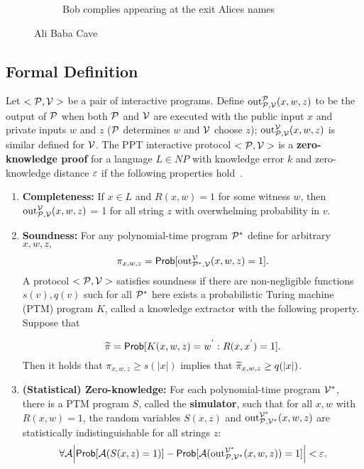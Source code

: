 \begin{figure}[t!]
\begin{subfigure}[t]{0.30\textwidth}
{\begin{tikzpicture}[scale=1]
      \end{tikzpicture}
    }
    \caption{Bob complies appearing at the exit Alices names}
    \label{fig:zkp:alibaba:c}
  \end{subfigure}
  \caption{Ali Baba Cave}
  \label{fig:zkp:alibaba}
\end{figure}

\subsection[Formal Definition]{Formal Definition~\cite{kiagias:crypto}}
\label{zkp:definition}

Let $<\calp, \calv>$ be a pair of interactive programs. Define $\text{out}^{\calp}_{\calp, \calv}(x,w,z)$
to be the output of $\calp$ when both $\calp$ and $\calv$ are executed with the public input $x$ and private
inputs $w$ and $z$ ($\calp$ determines $w$ and $\calv$ choose $z$); $\text{out}^{\calv}_{\calp, \calv}(x,w,z)$
is similar defined for $\calv$. The PPT interactive protocol $<\calp, \calv>$ is a \textbf{zero-knowledge proof}
for a language $L \in NP$ with knowledge error $k$ and zero-knowledge distance $\e$ if the following
properties hold~\cite{kiagias:crypto}.

\begin{enumerate}
  \item \textbf{Completeness:} If $x \in L$ and $R(x,w) = 1$ for some witness $w$, then $\text{out}^{\calv}_{\calp, \calv}(x,w,z)$ = 1
    for all string $z$ with overwhelming probability in $v$.
  \item \textbf{Soundness:} For any polynomial-time program $\calp^{*}$ define for arbitrary $x,w,z,$
    \begin{equation*}
      \pi_{x,w,z} = \Prob[\text{out}^{\calv}_{\calp^{*}, \calv}(x,w,z) = 1].
    \end{equation*}
    A protocol $<\calp, \calv>$ satisfies soundness if there are non-negligible functions $s(v), q(v)$ such for all $\calp^{*}$ here exists a probabilistic
    Turing machine (PTM) program $K$, called a knowledge extractor with the following property. Suppose that

    \begin{equation*}
      \widetilde{\pi} = \Prob[K(x,w,z) = w^{'} : R(x, x^{'}) = 1].
    \end{equation*}
    Then it holds that $\pi_{x,w,z} \geq s(|x|)$ implies that $\widetilde{\pi}_{x,w,z} \geq q(\abs{x})$.

  \item \textbf{(Statistical) Zero-knowledge:} For each polynomial-time program $\calv^{*}$, there is a PTM program $S$, called the \textbf{simulator}, such that for all
    $x,w$ with $R(x,w) = 1$, the random variables $S(x,z)$ and $\text{out}^{\calv^{*}}_{\calp, \calv^{*}}(x,w,z)$ are statistically indistinguishable for all strings $z$:
    \begin{equation*}
      \forall \cala \abs[\Big]{\Prob[\cala(S(x,z) = 1)] - \Prob[\cala(\text{out}^{\calv^{*}}_{\calp, \calv^{*}}(x,w,z)) = 1]} < \e.
    \end{equation*}
\end{enumerate}

